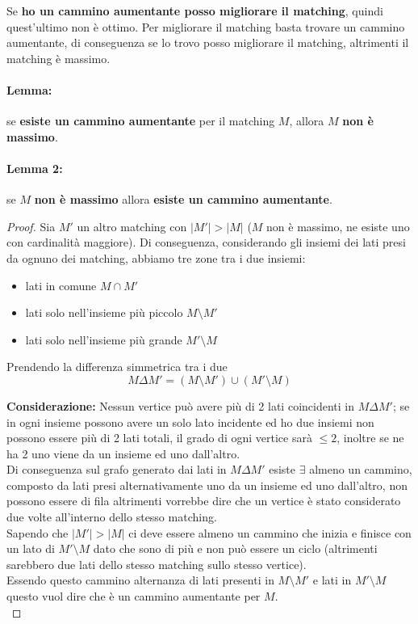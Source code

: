 Se \textbf{ho un cammino aumentante posso migliorare il matching}, quindi quest'ultimo non è ottimo. Per migliorare il matching basta trovare un cammino aumentante, di conseguenza se lo trovo posso migliorare il matching, altrimenti il matching è massimo.\\

\paragraph{Lemma:} se \textbf{esiste un cammino aumentante} per il matching $M$, allora $M$ \textbf{non è massimo}.\\

\paragraph{Lemma 2:} se $M$ \textbf{non è massimo} allora \textbf{esiste un cammino aumentante}.\\

\begin{proof}
	Sia $M'$ un altro matching con $|M'| > |M|$ ($M$ non è massimo, ne esiste uno con cardinalità maggiore). Di conseguenza, considerando gli insiemi dei lati presi da ognuno dei matching, abbiamo tre zone tra i due insiemi: 
	\begin{itemize}
		\item lati in comune $M \cap M'$
		\item lati solo nell'insieme più piccolo $M \setminus M'$
		\item lati solo nell'insieme più grande $M' \setminus M$
	\end{itemize}
	
	Prendendo la differenza simmetrica tra i due
	$$ M \Delta M' = (M \setminus M') \cup (M' \setminus M)$$
	
	\textbf{Considerazione:} Nessun vertice può avere più di 2 lati coincidenti in $M \Delta M'$; se in ogni insieme possono avere un solo lato incidente ed ho due insiemi non possono essere più di 2 lati totali, il grado di ogni vertice sarà $\leq 2$, inoltre se ne ha 2 uno viene da un insieme ed uno dall'altro. \\ 
	Di conseguenza sul grafo generato dai lati in $M \Delta M'$ esiste $\exists$ almeno un cammino, composto da lati presi alternativamente uno da un insieme ed uno dall'altro, non possono essere di fila altrimenti vorrebbe dire che un vertice è stato considerato due volte all'interno dello stesso matching.\\
	Sapendo che $|M'| > |M|$ ci deve essere almeno un cammino che inizia e finisce con un lato di $M' \setminus M$ dato che sono di più e non può essere un ciclo (altrimenti sarebbero due lati dello stesso matching sullo stesso vertice). \\
	
	Essendo questo cammino alternanza di lati presenti in $M \setminus M'$ e lati in $M' \setminus M$ questo vuol dire che è un cammino aumentante per $M$.\\
\end{proof}

